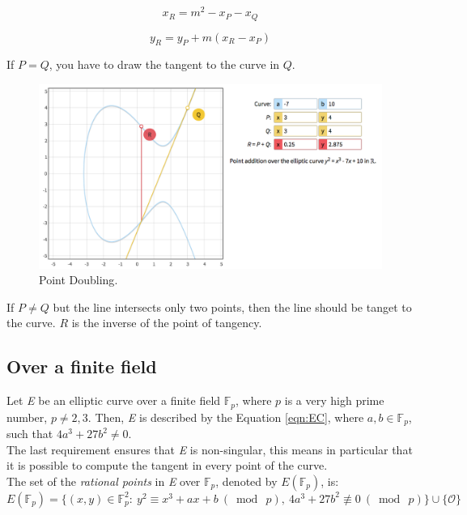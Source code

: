 \begin{equation}
x_{R}=m^{2}-x_{P}-x_{Q}
\end{equation}

\begin{equation}
y_{R}=y_{P}+m(x_{R}-x_{P})
\end{equation}

If $P=Q$, you have to draw the tangent to the curve in $Q$.

\begin{figure}[H]
	\centering
	\includegraphics[width=.7\textwidth]{doubling.png}
	\caption{Point Doubling\cite{graf}.}
	\label{img:ec prod}
\end{figure}

If $P\neq Q$ but the line intersects only two points, then the line should be tanget to the curve. $R$ is the inverse of the point of tangency.

\subsection{Over a finite field}
Let \textit{E} be an elliptic curve over a finite field $\mathbb{F}_{p}$, where $p$ is a very high prime number, $p\neq 2,3$. Then, \textit{E} is described by the Equation \eqref{eqn:EC}, where $a,b \in \mathbb{F}_{p}$, such that $4a^{3}+27b^{2}\neq 0$.\\
The last requirement ensures that \textit{E} is non-singular, this means in particular that it is possible to compute the tangent in every point of the curve.\\
The set of the \textit{rational points} in \textit{E} over $\mathbb{F}_{p}$, denoted by $E(\mathbb{F}_{p})$, is:
\begin{equation}
	E(\mathbb{F}_{p})=\{(x,y)\in \mathbb{F}_{p}^{2} :\ y^{2}\equiv x^{3}+ax+b\ (\bmod\ p),\ 4a^{3}+27b^{2}\not\equiv 0\ (\bmod\ p) \}\cup \{\mathcal{O}\}
\end{equation}

